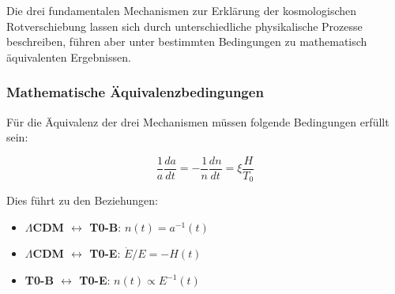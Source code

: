 \documentclass[12pt,a4paper]{article}
\theoremstyle{definition}
\begin{document}
	Die drei fundamentalen Mechanismen zur Erkl\"arung der kosmologischen Rotverschiebung lassen sich durch unterschiedliche physikalische Prozesse beschreiben, f\"uhren aber unter bestimmten Bedingungen zu mathematisch \"aquivalenten Ergebnissen.
	
	\begin{table}[h]
		\centering
		\caption{Vergleich der Rotverschiebungsmechanismen mit erweiterten Entwicklungen}
	\end{table}
	
	\subsubsection{Mathematische \"Aquivalenzbedingungen}
	
	F\"ur die \"Aquivalenz der drei Mechanismen m\"ussen folgende Bedingungen erf\"ullt sein:
	
	\begin{equation}
		\boxed{\frac{1}{a}\frac{da}{dt} = -\frac{1}{n}\frac{dn}{dt} = \xi \frac{H}{T_0}}
	\end{equation}
	
	Dies f\"uhrt zu den Beziehungen:
	\begin{itemize}
		\item \textbf{$\Lambda$CDM $\leftrightarrow$ T0-B}: $n(t) = a^{-1}(t)$
		\item \textbf{$\Lambda$CDM $\leftrightarrow$ T0-E}: $\dot{E}/E = -H(t)$
		\item \textbf{T0-B $\leftrightarrow$ T0-E}: $n(t) \propto E^{-1}(t)$
	\end{itemize}
	
\end{document}
